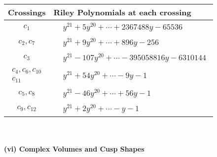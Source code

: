 \documentclass[1p]{elsarticle_modified}
\theoremstyle{definition}
\begin{document}
\begin{tabular}{m{50pt}|m{274pt}}
Crossings & \hspace{64pt}Riley Polynomials at each crossing \\
\hline $$\begin{aligned}c_{1}\end{aligned}$$&$\begin{aligned}
&y^{21}+5 y^{20}+\cdots+2367488 y-65536
\end{aligned}$\\
\hline $$\begin{aligned}c_{2},c_{7}\end{aligned}$$&$\begin{aligned}
&y^{21}+9 y^{20}+\cdots+896 y-256
\end{aligned}$\\
\hline $$\begin{aligned}c_{3}\end{aligned}$$&$\begin{aligned}
&y^{21}-107 y^{20}+\cdots-395058816 y-6310144
\end{aligned}$\\
\hline $$\begin{aligned}c_{4},c_{6},c_{10}\\c_{11}\end{aligned}$$&$\begin{aligned}
&y^{21}+54 y^{20}+\cdots-9 y-1
\end{aligned}$\\
\hline $$\begin{aligned}c_{5},c_{8}\end{aligned}$$&$\begin{aligned}
&y^{21}-46 y^{20}+\cdots+56 y-1
\end{aligned}$\\
\hline $$\begin{aligned}c_{9},c_{12}\end{aligned}$$&$\begin{aligned}
&y^{21}+2 y^{20}+\cdots- y-1
\end{aligned}$\\
\hline
\end{tabular}\\~\\
\newpage\flushleft \textbf{(vi) Complex Volumes and Cusp Shapes}
\end{document}
